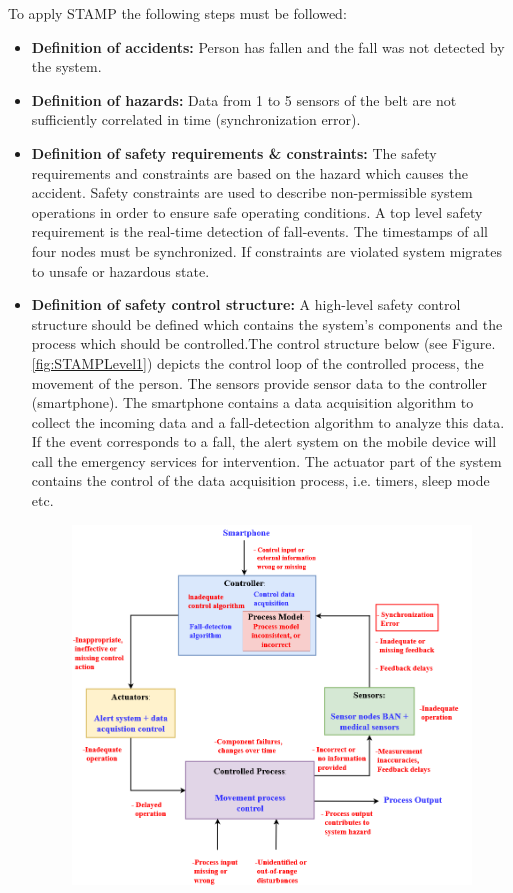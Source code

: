 \documentclass[review]{elsarticle}
\begin{document}
To apply STAMP the following steps must be followed:

\begin{itemize}
	\item \textbf{Definition of accidents:} Person has fallen and the fall was not detected by the system.
	\item \textbf{Definition of hazards:} Data from 1 to 5 sensors of the belt are not sufficiently correlated in time (synchronization error).
	\item \textbf{Definition of safety requirements \& constraints:} The safety requirements and constraints are based on the hazard which causes the accident. Safety constraints are used to describe non-permissible system operations in order to ensure safe operating conditions. A top level safety requirement is the real-time detection of fall-events. The timestamps of all four nodes must be synchronized. If constraints are violated system migrates to unsafe or hazardous state.
	\item \textbf{Definition of safety control structure:}
	A high-level safety control structure should be defined which contains the system's components and the process which should be controlled.The control structure below (see Figure. \ref{fig:STAMPLevel1}) depicts the control loop of the controlled process, the movement of the person.
	The sensors provide sensor data to the controller (smartphone). The smartphone contains a data acquisition algorithm to collect the incoming data and a fall-detection algorithm to analyze this data. If the event corresponds to a fall, the alert system on the mobile device will call the emergency services for intervention. The actuator part of the system contains the control of the data acquisition process, i.e. timers, sleep mode etc. \newpage
	\begin{figure}[!ht]
		\centering
		\includegraphics[scale=0.35]{images/STAMP_SynchError}

\end{figure}
\end{itemize}
\end{document}
